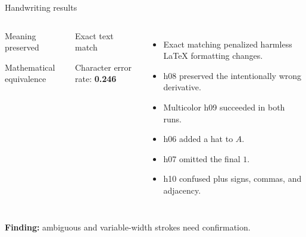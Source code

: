 \documentclass[aspectratio=169,10pt]{beamer}
\newcommand{\risk}[1]{\textcolor{Rust}{\textbf{#1}}}
\begin{document}
\begin{frame}{Handwriting results}
\begin{columns}[T,onlytextwidth]
\begin{block}{Meaning preserved}\par Mathematical equivalence\end{block}
\begin{block}{Exact text match}\par Character error rate: \textbf{0.246}\end{block}
\begin{itemize}
\item Exact matching penalized harmless LaTeX formatting changes.
\item h08 preserved the intentionally wrong derivative.
\item Multicolor h09 succeeded in both runs.
\item h06 added a hat to $A$.
\item h07 omitted the final $1$.
\item h10 confused plus signs, commas, and adjacency.
\end{itemize}
\end{columns}
\vspace{.3em}
\centering\risk{Finding:} ambiguous and variable-width strokes need confirmation.
\end{frame}
\end{document}
